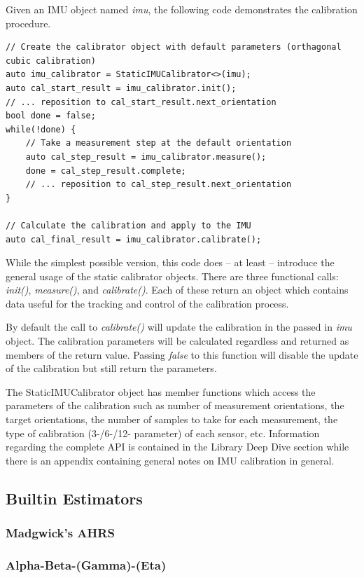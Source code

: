 \documentclass[10pt,letterpaper]{memoir} %
\begin{document}
Given an IMU object named \emph{imu}, the following code demonstrates the calibration procedure.
\begin{verbatim}
// Create the calibrator object with default parameters (orthagonal cubic calibration)
auto imu_calibrator = StaticIMUCalibrator<>(imu);
auto cal_start_result = imu_calibrator.init();
// ... reposition to cal_start_result.next_orientation
bool done = false;
while(!done) {
	// Take a measurement step at the default orientation
	auto cal_step_result = imu_calibrator.measure();
	done = cal_step_result.complete;
	// ... reposition to cal_step_result.next_orientation
}

// Calculate the calibration and apply to the IMU
auto cal_final_result = imu_calibrator.calibrate();
\end{verbatim} 
While the simplest possible version, this code does -- at least -- introduce the general usage of the static calibrator objects.  There are three functional calls: \emph{init()}, \emph{measure()}, and \emph{calibrate()}.  Each of these return an object which contains data useful for the tracking and control of the calibration process.  

By default the call to \emph{calibrate()} will update the calibration in the passed in \emph{imu} object.  The calibration parameters will be calculated regardless and returned as members of the return value.  Passing \emph{false} to this function will disable the update of the calibration but still return the parameters.

The StaticIMUCalibrator object has member functions which access the parameters of the calibration such as number of measurement orientations, the target orientations, the number of samples to take for each measurement, the type of calibration (3-/6-/12- parameter) of each sensor, etc.  Information regarding the complete API is contained in the Library Deep Dive section while there is an appendix containing general notes on IMU calibration in general.

\subsection{Builtin Estimators}
\subsubsection{Madgwick's AHRS}
\subsubsection{Alpha-Beta-(Gamma)-(Eta)}
\end{document}
